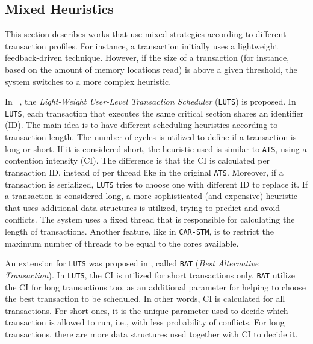 \subsection{Mixed Heuristics}\label{sec:mixedHeuristic}
This section describes works that use mixed strategies according to different transaction profiles. For instance, a transaction initially uses a lightweight feedback-driven technique. However, if the size of a transaction (for instance, based on the amount of memory locations read) is above a given threshold, the system switches to a more complex heuristic.

In ~\citeyearpar{Nicacio:2011,Nicacio:2012}, the \emph{Light-Weight User-Level Transaction Scheduler} (\texttt{LUTS}) is proposed. In \texttt{LUTS}, each transaction that executes the same critical section shares an identifier (ID). The main idea is to have different scheduling heuristics according to  transaction length. The number of cycles  is utilized to define if a transaction is long or short. If it is considered short, the heuristic used is similar to \texttt{ATS}, using a contention intensity (CI). The difference is that the CI is calculated per transaction ID, instead of per thread like in the original \texttt{ATS}. Moreover, if a transaction is serialized, \texttt{LUTS} tries to choose one with different ID to replace it. If a transaction is considered long, a more sophisticated (and expensive) heuristic that uses additional data structures is utilized, trying to predict and avoid conflicts. The system uses a fixed thread that is responsible for calculating the length of transactions. Another feature, like in \texttt{CAR-STM}, is to restrict the maximum number of threads to be equal to the cores available.

An extension for \texttt{LUTS} was proposed in \cite{Pereira:2013}, called \texttt{BAT} (\emph{Best Alternative Transaction}). In \texttt{LUTS}, the CI is utilized for short transactions only. \texttt{BAT} utilize the CI for long transactions too, as an additional parameter for helping to choose the best transaction to be scheduled. In other words, CI is calculated for all transactions. For short ones, it is the unique parameter used to decide which transaction is allowed to run, i.e., with less probability of conflicts. For long transactions, there are more data structures used together with CI to decide it. 

